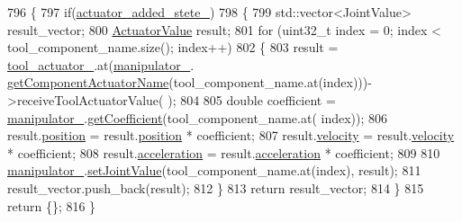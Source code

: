 \begin{DoxyCode}
796 \{
797   \textcolor{keywordflow}{if}(\hyperlink{classrobotis__manipulator_1_1_robotis_manipulator_a02073b7982b992642b28acfa35a17769}{actuator\_added\_stete\_})
798   \{
799     std::vector<JointValue> result\_vector;
800     \hyperlink{structrobotis__manipulator_1_1_point}{ActuatorValue} result;
801     \textcolor{keywordflow}{for} (uint32\_t index = 0; index < tool\_component\_name.size(); index++)
802     \{
803       result = \hyperlink{classrobotis__manipulator_1_1_robotis_manipulator_a9d472875a989092466257d14dff2bdcf}{tool\_actuator\_}.at(\hyperlink{classrobotis__manipulator_1_1_robotis_manipulator_a5b2df4a3b3ee7f408cb1d0eaf61644dc}{manipulator\_}.
      \hyperlink{classrobotis__manipulator_1_1_manipulator_a371446cbf4d2d5a572b173d713305fb1}{getComponentActuatorName}(tool\_component\_name.at(index)))->receiveToolActuatorValue(
      );
804 
805       \textcolor{keywordtype}{double} coefficient = \hyperlink{classrobotis__manipulator_1_1_robotis_manipulator_a5b2df4a3b3ee7f408cb1d0eaf61644dc}{manipulator\_}.\hyperlink{classrobotis__manipulator_1_1_manipulator_a437ac5f137aa788c4db07690c185e9ba}{getCoefficient}(tool\_component\_name.at(
      index));
806       result.\hyperlink{structrobotis__manipulator_1_1_point_a0f122386b502d9b316bdead542ed2145}{position} = result.\hyperlink{structrobotis__manipulator_1_1_point_a0f122386b502d9b316bdead542ed2145}{position} * coefficient;
807       result.\hyperlink{structrobotis__manipulator_1_1_point_a4eaec95fac0c755eb0aa704b36ebe97b}{velocity} = result.\hyperlink{structrobotis__manipulator_1_1_point_a4eaec95fac0c755eb0aa704b36ebe97b}{velocity} * coefficient;
808       result.\hyperlink{structrobotis__manipulator_1_1_point_adb49f1fbcc0eaa7f530c54fdf0ede836}{acceleration} = result.\hyperlink{structrobotis__manipulator_1_1_point_adb49f1fbcc0eaa7f530c54fdf0ede836}{acceleration} * coefficient;
809 
810       \hyperlink{classrobotis__manipulator_1_1_robotis_manipulator_a5b2df4a3b3ee7f408cb1d0eaf61644dc}{manipulator\_}.\hyperlink{classrobotis__manipulator_1_1_manipulator_aa740b17551040520851ec8dc1d619bfe}{setJointValue}(tool\_component\_name.at(index), result);
811       result\_vector.push\_back(result);
812     \}
813     \textcolor{keywordflow}{return} result\_vector;
814   \}
815   \textcolor{keywordflow}{return} \{\};
816 \}
\end{DoxyCode}


